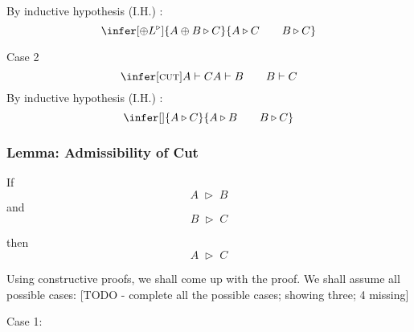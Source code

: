 \documentclass{article}
\begin{document}
By inductive hypothesis (I.H.) :
\[
\infer[\oplus L^\triangleright]{A \oplus B \triangleright C}{A \triangleright C \hspace{2em} B \triangleright C}
\]

Case 2
\[
\infer[\textsc{cut}]{A \vdash C}{A \vdash B \hspace{2em} B \vdash C}
\]
By inductive hypothesis (I.H.) :
\[
\infer[]{A \triangleright C}{A \triangleright B \hspace{2em} B \triangleright C}
\]


\subsubsection{Lemma: Admissibility of Cut}
If 
\[
\; A\; \triangleright\; B\; 
\] 
and
\[
\; B\; \triangleright\; C\; 
\]

then
\[
\; A\; \triangleright\; C\; 
\]

Using constructive proofs, we shall come up with the proof. We shall assume all possible cases:
[TODO - complete all the possible cases; showing three; 4 missing]

Case 1:










\end{document}
